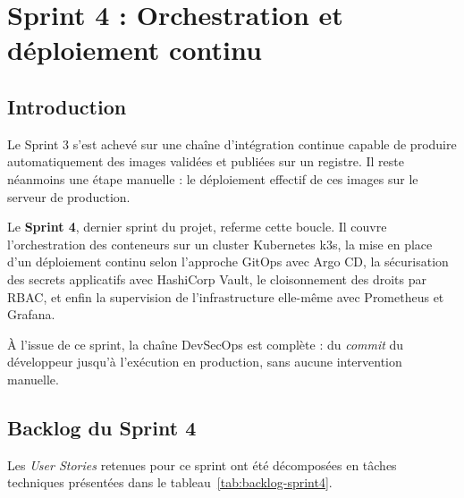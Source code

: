 \thispagestyle{fancy}

\chapter{Sprint 4 : Orchestration et déploiement continu}

\newsavebox{\manifbox}

\section*{Introduction}
Le Sprint 3 s'est achevé sur une chaîne d'intégration continue capable de produire
automatiquement des images validées et publiées sur un registre. Il reste néanmoins une
étape manuelle : le déploiement effectif de ces images sur le serveur de production.

Le \textbf{Sprint 4}, dernier sprint du projet, referme cette boucle. Il couvre
l'orchestration des conteneurs sur un cluster Kubernetes k3s, la mise en place d'un
déploiement continu selon l'approche GitOps avec Argo CD, la sécurisation des secrets
applicatifs avec HashiCorp Vault, le cloisonnement des droits par RBAC, et enfin la
supervision de l'infrastructure elle-même avec Prometheus et Grafana.

À l'issue de ce sprint, la chaîne DevSecOps est complète : du \textit{commit} du
développeur jusqu'à l'exécution en production, sans aucune intervention manuelle.

\section{Backlog du Sprint 4}
Les \textit{User Stories} retenues pour ce sprint ont été décomposées en tâches
techniques présentées dans le tableau~\ref{tab:backlog-sprint4}.

